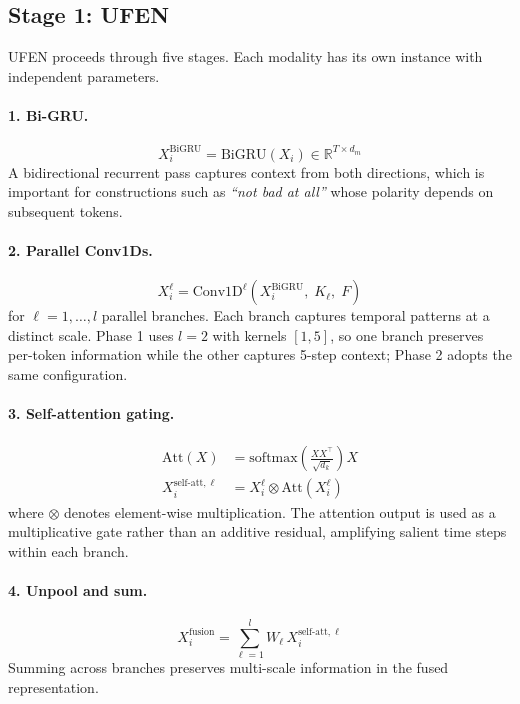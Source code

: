 \documentclass[11pt,twocolumn]{article}
\begin{document}
\subsection{Stage 1: UFEN}
\label{sec:ufen}

UFEN proceeds through five stages. Each modality has its own instance with independent parameters.

\paragraph{1. Bi-GRU.}
\begin{equation}
X_i^{\text{BiGRU}} = \text{BiGRU}(X_i) \in \mathbb{R}^{T \times d_m}
\end{equation}
A bidirectional recurrent pass captures context from both directions, which is important for constructions such as \emph{``not bad at all''} whose polarity depends on subsequent tokens.

\paragraph{2. Parallel Conv1Ds.}
\begin{equation}
X_i^{\ell} = \text{Conv1D}^{\ell}\!\left(X_i^{\text{BiGRU}},\; K_\ell,\; F\right)
\end{equation}
for $\ell = 1, \ldots, l$ parallel branches. Each branch captures temporal patterns at a distinct scale. Phase 1 uses $l=2$ with kernels $[1, 5]$, so one branch preserves per-token information while the other captures 5-step context; Phase 2 adopts the same configuration.

\paragraph{3. Self-attention gating.}
\begin{align}
\text{Att}(X) &= \text{softmax}\!\left(\tfrac{X X^\top}{\sqrt{d_k}}\right) X \\
X_i^{\text{self-att},\ell} &= X_i^{\ell} \otimes \text{Att}(X_i^{\ell})
\end{align}
where $\otimes$ denotes element-wise multiplication. The attention output is used as a multiplicative gate rather than an additive residual, amplifying salient time steps within each branch.

\paragraph{4. Unpool and sum.}
\begin{equation}
X_i^{\text{fusion}} = \sum_{\ell=1}^{l} W_\ell \, X_i^{\text{self-att},\ell}
\end{equation}
Summing across branches preserves multi-scale information in the fused representation.
\end{document}
